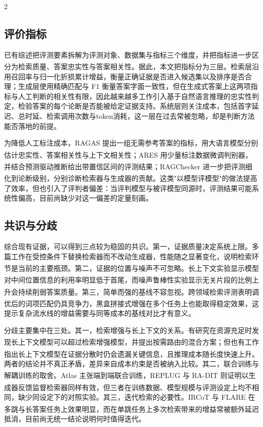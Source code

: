 \documentclass[10.5pt,compsoc,UTF8]{CjC}
\theoremstyle{mystyle}
\newcommand{\upcite}[1]{\textsuperscript{\cite{#1}}}
\begin{document}
\begin{multicols}{2}

\subsection{\heiti 评价指标}

已有综述把评测要素拆解为评测对象、数据集与指标三个维度，并把指标进一步区分为检索质量、答案忠实性与答案相关性\upcite{yu2024evaluation}。据此，本文把指标分为三层。检索层沿用召回率与归一化折损累计增益，衡量正确证据是否进入候选集以及排序是否合理；生成层使用精确匹配与 F1 衡量答案字面一致性，但在生成式答案上这两项指标与人工判断的相关性有限，因此越来越多工作引入基于自然语言推理的忠实性判定，检验答案的每个论断是否能被给定证据支持。系统层则关注成本，包括首字延迟、总时延、检索调用次数与token消耗，这一层在过去常被忽略，却是判断方法能否落地的前提。

为降低人工标注成本，RAGAS 提出一组无需参考答案的指标，用大语言模型分别估计忠实性、答案相关性与上下文相关性\upcite{es2023ragas}；ARES 用少量标注数据微调判别器，并结合预测驱动推断给出带置信区间的评测结果\upcite{saadfalcon2024ares}；RAGChecker 进一步把评测细化到论断级别，分别诊断检索器与生成器的贡献\upcite{ru2024ragchecker}。这类"以模型评模型"的做法提高了效率，但也引入了评判者偏差：当评判模型与被评模型同源时，评测结果可能系统性偏高，目前尚缺少对这一偏差的定量刻画。

\subsection{\heiti 共识与分歧}

综合现有证据，可以得到三点较为稳固的共识。第一，证据质量决定系统上限。多篇工作在受控条件下替换检索器而不改动生成器，性能随之显著变化，说明检索环节是当前的主要瓶颈\upcite{chen2024benchmarking,yang2024crag}。第二，证据的位置与噪声不可忽略。长上下文实验显示模型对中间位置信息的利用率明显低于首尾\upcite{liu2024lost}，而噪声鲁棒性实验显示无关片段的比例上升会持续削弱答案质量\upcite{chen2024benchmarking}。第三，简单而强的基线不容忽视。跨领域检索评测表明调优后的词项匹配仍具竞争力\upcite{thakur2021beir}，黑盒拼接式增强在多个任务上也能取得稳定效果\upcite{ram2023context}，这提示复杂流水线的增益需要与同等成本的基线对比才有意义。

分歧主要集中在三处。其一，检索增强与长上下文的关系。有研究在资源充足时发现长上下文模型可以超过检索增强模型，并提出按需路由的混合方案\upcite{li2024retrieval}；但也有工作指出长上下文模型在证据分散时仍会遗漏关键信息，且推理成本随长度快速上升\upcite{liu2024lost}。两者的结论并不真正矛盾，差异来自成本约束是否被纳入比较。其二，联合训练与解耦训练的取舍。Atlas 主张端到端联合训练\upcite{izacard2022atlas}，REPLUG 与 RA-DIT 则证明以生成器反馈监督检索器同样有效\upcite{shi2023replug,lin2024dit}，但三者在训练数据、模型规模与评测设定上均不相同，缺少同设定下的对照实验。其三，迭代检索的必要性。IRCoT 与 FLARE 在多跳与长答案任务上效果明显\upcite{trivedi2023interleaving,jiang2023active}，而在单跳任务上多次检索带来的增益常被额外延迟抵消，目前尚无统一结论说明何时值得迭代。


\end{multicols}
\end{document}
